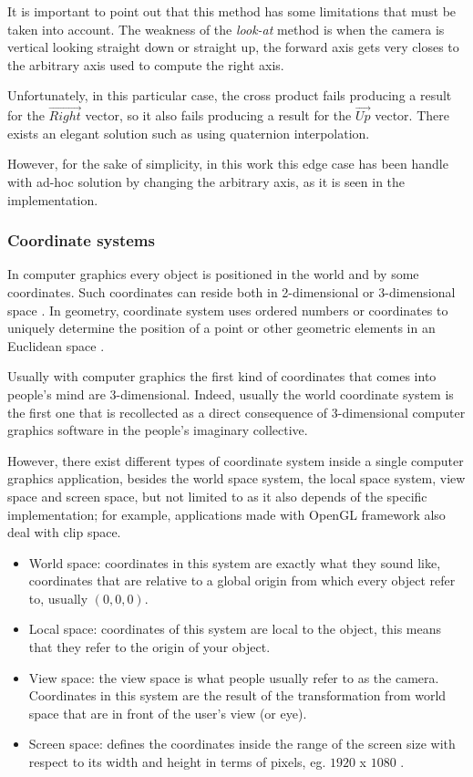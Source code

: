 \documentclass[12pt,a4paper]{extarticle}
\begin{document}
It is important to point out that this method has some limitations that must be taken into account. The weakness of the \textit{look-at} method is when the camera is vertical looking straight down or straight up, the forward axis gets very closes to the arbitrary axis used to compute the right axis. 

Unfortunately, in this particular case, the cross product fails producing a result for the $\vec{Right}$ vector, so it also fails producing a result for the $\vec{Up}$ vector. There exists an elegant solution such as using quaternion interpolation. 

However, for the sake of simplicity, in this work this edge case has been handle with ad-hoc solution by changing the arbitrary axis, as it is seen in the implementation.
\subsubsection{Coordinate systems}
In computer graphics every object is positioned in the world and by some coordinates. Such coordinates can reside both in 2-dimensional or 3-dimensional space \cite{wiki_coordinate:1}. In geometry, coordinate system uses ordered numbers or coordinates to uniquely determine the position of a point or other geometric elements in an Euclidean space \cite{wiki_euclidean:1}.

Usually with computer graphics the first kind of coordinates that comes into people's mind are 3-dimensional. Indeed, usually the world coordinate system is the first one that is recollected as a direct consequence of 3-dimensional computer graphics software in the people's imaginary collective.


However, there exist different types of coordinate system inside a single computer graphics application, besides the world space system, the local space system, view space and screen space, but not limited to as it also depends of the specific implementation; for example, applications made with OpenGL framework also deal with clip space.
\begin{itemize}
\item World space: coordinates in this system are exactly what they sound like, coordinates that are relative to a global origin from which every object refer to, usually $(0,0,0)$.
\item Local space: coordinates of this system are local to the object, this means that they refer to the origin of your object.
\item View space: the view space is what people usually refer to as the camera. Coordinates in this system are the result of the transformation from world space that are in front of the user's view (or eye).
\item Screen space: defines the coordinates inside the range of the screen size with respect to its width and height in terms of pixels, eg. $1920$ x $1080$ .
\end{itemize}
\end{document}
